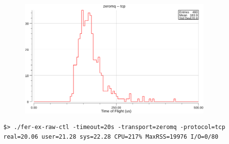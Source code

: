 \documentclass[9pt]{beamer}
\begin{document}
\begin{frame}[fragile]
\frametitle{}


\begin{figure}[h]
\begin{center}
\includegraphics[width=10cm,height=6cm]{_figs/tof-zeromq-tcp.png}
\end{center}

\end{figure}


\begin{verbatim}
$> ./fer-ex-raw-ctl -timeout=20s -transport=zeromq -protocol=tcp
real=20.06 user=21.28 sys=22.28 CPU=217% MaxRSS=19976 I/O=0/80

\end{verbatim}



\end{frame}
\end{document}
